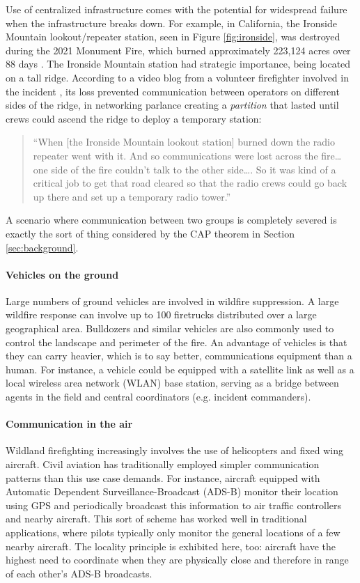 \documentclass[]             %
{NASA}                       %
\theoremstyle{definition}
\begin{document}
Use of centralized infrastructure comes with the potential for
widespread failure when the infrastructure breaks down. For example,
in California, the Ironside Mountain lookout/repeater station, seen in
Figure \ref{fig:ironside}, was destroyed during the 2021 Monument
Fire, which burned approximately 223,124 acres over 88 days
\cite{2021:monumentfire}. The Ironside Mountain station had strategic
importance, being located on a tall ridge. According to a video blog
from a volunteer firefighter involved in the incident \cite{2022:mechfire},
its loss prevented communication between operators on different sides
of the ridge, in networking parlance creating a \emph{partition} that
lasted until crews could ascend the ridge to deploy a temporary
station:
\begin{quote}
  ``When {[}the Ironside Mountain lookout station{]} burned down the
  radio repeater went with it. And so communications were lost across
  the fire\ldots{} one side of the fire couldn't talk to the other
  side\ldots.  So it was kind of a critical job to get that road
  cleared so that the radio crews could go back up there and set up a
  temporary radio tower.''
\end{quote}
A scenario where communication between two groups is completely
severed is exactly the sort of thing considered by the CAP theorem in
Section \ref{sec:background}.

\paragraph{Vehicles on the ground}
Large numbers of ground vehicles are involved in wildfire
suppression. A large wildfire response can involve up to 100
firetrucks distributed over a large geographical area. Bulldozers and
similar vehicles are also commonly used to control the landscape and
perimeter of the fire. An advantage of vehicles is that they can carry
heavier, which is to say better, communications equipment than a
human. For instance, a vehicle could be equipped with a satellite link
as well as a local wireless area network (WLAN) base station, serving
as a bridge between agents in the field and central coordinators
(e.g. incident commanders).

\paragraph{Communication in the air}
Wildland firefighting increasingly involves the use of helicopters and
fixed wing aircraft. Civil aviation has traditionally employed simpler
communication patterns than this use case demands. For instance,
aircraft equipped with Automatic Dependent Surveillance-Broadcast
(ADS-B) monitor their location using GPS and periodically broadcast
this information to air traffic controllers and nearby aircraft. This
sort of scheme has worked well in traditional applications, where
pilots typically only monitor the general locations of a few nearby
aircraft. The locality principle is exhibited here, too: aircraft have
the highest need to coordinate when they are physically close and
therefore in range of each other's ADS-B broadcasts.
\end{document}
